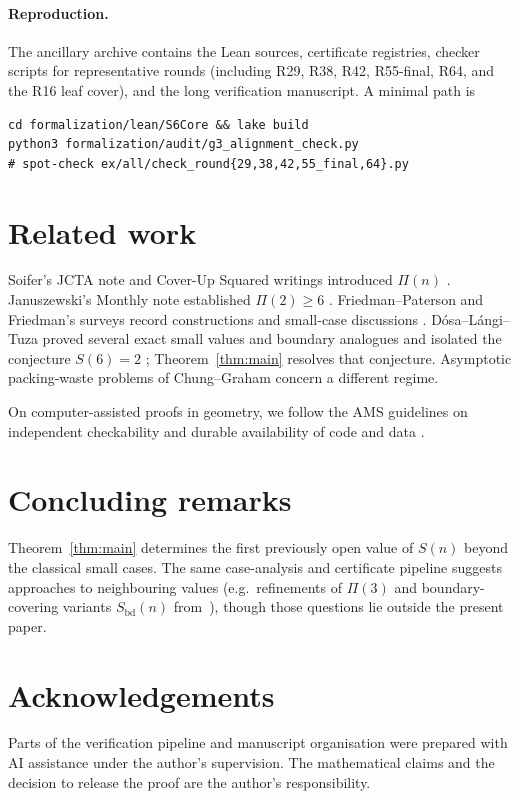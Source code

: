 \documentclass[11pt,reqno]{amsart}
\theoremstyle{definition}
\begin{document}
\paragraph{Reproduction.}
The ancillary archive contains the Lean sources, certificate registries,
checker scripts for representative rounds (including R29, R38, R42, R55-final,
R64, and the R16 leaf cover), and the long verification manuscript.  A minimal
path is
\begin{verbatim}
cd formalization/lean/S6Core && lake build
python3 formalization/audit/g3_alignment_check.py
# spot-check ex/all/check_round{29,38,42,55_final,64}.py
\end{verbatim}

\section{Related work}\label{sec:related}

Soifer's JCTA note and Cover-Up Squared writings introduced $\Pi(n)$
\cite{Soifer2006,SoiferCoverUp}.
Januszewski's Monthly note established $\Pi(2)\ge 6$ \cite{Januszewski2009}.
Friedman--Paterson and Friedman's surveys record constructions and small-case
discussions \cite{FriedmanPaterson2006,FriedmanCovering}.
D\'osa--L\'angi--Tuza proved several exact small values and boundary analogues
and isolated the conjecture $S(6)=2$ \cite{DLT2026}; Theorem~\ref{thm:main}
resolves that conjecture.
Asymptotic packing-waste problems of Chung--Graham
\cite{ChungGraham2009,ChungGraham2020} concern a different regime.

On computer-assisted proofs in geometry, we follow the AMS guidelines on
independent checkability and durable availability of code and data
\cite{AMSComputerAssisted}.

\section{Concluding remarks}\label{sec:conclusion}

Theorem~\ref{thm:main} determines the first previously open value of $S(n)$
beyond the classical small cases.  The same case-analysis and certificate
pipeline suggests approaches to neighbouring values (e.g.\ refinements of
$\Pi(3)$ and boundary-covering variants $S_{\mathrm{bd}}(n)$ from~\cite{DLT2026}),
though those questions lie outside the present paper.

\section*{Acknowledgements}
Parts of the verification pipeline and manuscript organisation were prepared
with AI assistance under the author's supervision.  The mathematical claims and
the decision to release the proof are the author's responsibility.



\end{document}
